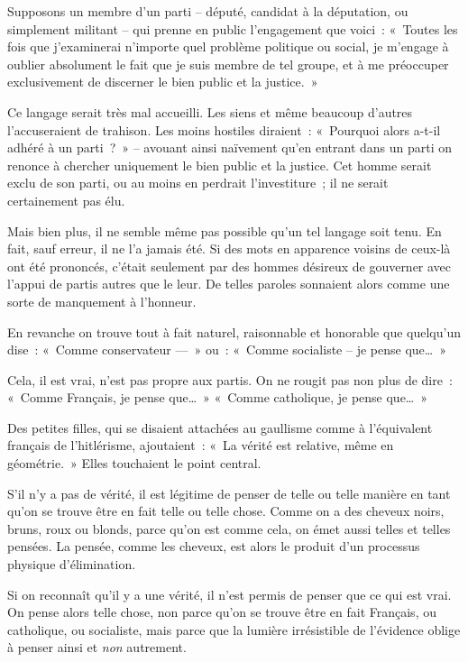 \documentclass[french,twoside]{book} %
\begin{document}
Supposons un membre d’un parti – député, candidat à la députation, ou simplement militant – qui prenne en public l’engagement que voici : « Toutes les fois que j’examinerai n’importe quel problème politique ou social, je m’engage à oublier absolument le fait que je suis membre de tel groupe, et à me préoccuper exclusivement de discerner le bien public et la justice. »\par
Ce langage serait très mal accueilli. Les siens et même beaucoup d’autres l’accuseraient de trahison. Les moins hostiles diraient : « Pourquoi alors a-t-il adhéré à un parti ? » – avouant ainsi naïvement qu’en entrant dans un parti on renonce à chercher uniquement le bien public et la justice. Cet homme serait exclu de son parti, ou au moins en perdrait l’investiture ; il ne serait certainement pas élu.\par
Mais bien plus, il ne semble même pas possible qu’un tel langage soit tenu. En fait, sauf erreur, il ne l’a jamais été. Si des mots en apparence voisins de ceux-là ont été prononcés, c’était seulement par des hommes désireux de gouverner avec l’appui de partis autres que le leur. De telles paroles sonnaient alors comme une sorte de manquement à l’honneur.\par
En revanche on trouve tout à fait naturel, raisonnable et honorable que quelqu’un dise : « Comme conservateur — » ou : « Comme socialiste – je pense que… »\par
Cela, il est vrai, n’est pas propre aux partis. On ne rougit pas non plus de dire : « Comme Français, je pense que… » « Comme catholique, je pense que… »\par
Des petites filles, qui se disaient attachées au gaullisme comme à l’équivalent français de l’hitlérisme, ajoutaient : « La vérité est relative, même en géométrie. » Elles touchaient le point central.\par
S’il n’y a pas de vérité, il est légitime de penser de telle ou telle manière en tant qu’on se trouve être en fait telle ou telle chose. Comme on a des cheveux noirs, bruns, roux ou blonds, parce qu’on est comme cela, on émet aussi telles et telles pensées. La pensée, comme les cheveux, est alors le produit d’un processus physique d’élimination.\par
Si on reconnaît qu’il y a une vérité, il n’est permis de penser que ce qui est vrai. On pense alors telle chose, non parce qu’on se trouve être en fait Français, ou catholique, ou socialiste, mais parce que la lumière irrésistible de l’évidence oblige à penser ainsi et \emph{non} autrement.\par
\end{document}
